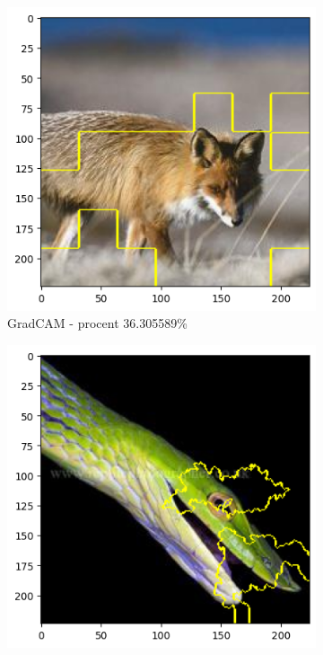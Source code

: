 \begin{figure}[h]
	\centering
	\begin{subfigure}[b]{0.3\textwidth}
		\includegraphics[width=.9\textwidth]{img/examples/appendix/n02119022_08938_gradcam}
		\caption{GradCAM - procent 36.305589\%}
	\end{subfigure}
	\begin{subfigure}[b]{0.3\textwidth}
		\includegraphics[width=.9\textwidth]{img/examples/appendix/n01739381_08888_lime}

\end{subfigure}
\end{figure}
